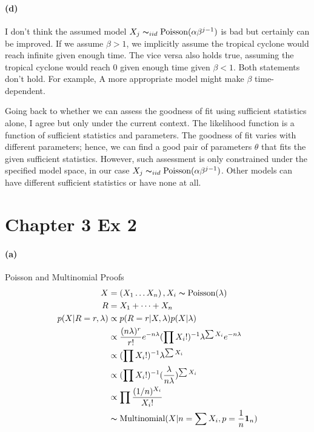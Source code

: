 \documentclass[11pt, letterpaper]{article}
\begin{document}
\paragraph{(d)}
I don't think the assumed model $X_j \thicksim_{iid} \text{Poisson}(\alpha \beta^{j-1})$ is bad but certainly can be improved. If we assume $\beta > 1$, we implicitly assume the tropical cyclone would reach infinite given enough time. The vice versa also holds true, assuming the tropical cyclone would reach 0 given enough time given $\beta < 1$. Both statements don't hold. For example, A more appropriate model might make $\beta$ time-dependent.

Going back to whether we can assess the goodness of fit using sufficient statistics alone, I agree but only under the current context. The likelihood function is a function of sufficient statistics and parameters. The goodness of fit varies with different parameters; hence, we can find a good pair of parameters $\theta$ that fits the given sufficient statistics. However, such assessment is only constrained under the specified model space, in our case $X_j \thicksim_{iid} \text{Poisson}(\alpha \beta^{j-1})$. Other models can have different sufficient statistics or have none at all.

\section{Chapter 3 Ex 2}
\paragraph{(a)} Poisson and Multinomial Proofs
\begin{align*}
    X &= (X_1 \dots X_n)\, , X_i \thicksim \text{Poisson}(\lambda) \\
    R &= X_1 + \dots + X_n \\
    p(X|R=r, \lambda) &\propto p(R=r|X, \lambda) p(X|\lambda) \\
        &\propto \frac{(n\lambda)^r}{r!} e^{-n\lambda} (\prod X_i!)^{-1} \lambda^{\sum X_i} e^{-n\lambda} \\
        &\propto (\prod X_i!)^{-1} \lambda^{\sum X_i} \\
        &\propto (\prod X_i!)^{-1} (\frac{\lambda}{n\lambda})^{\sum X_i} \\
        &\propto \prod \frac{(1/n)^{X_i}}{X_i!} \\
        &\thicksim \text{Multinomial}(X|n=\sum X_i, p=\frac{1}{n}\mathbf{1}_n)
\end{align*}
\end{document}
